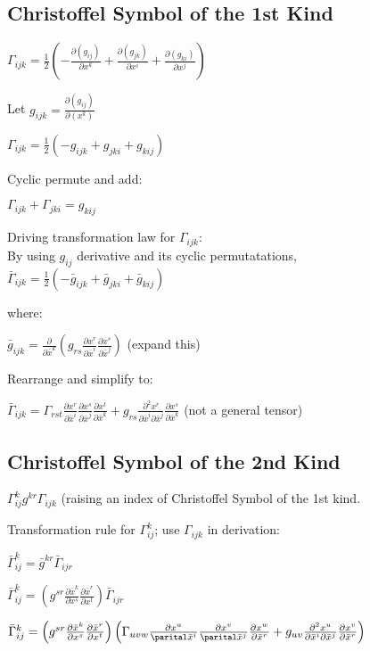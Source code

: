 \documentclass[8pt,letter]{article}
\begin{document}
\begin{multicols*}{2}
  \subsection{Christoffel Symbol of the 1st Kind}

  $\Gamma_{ijk} = \frac{1}{2}\left( - \frac{\partial (g_{ij})}{\partial x^k} + \frac{\partial (g_{jk})}{\partial x^i} + \frac{\partial (g_{ki})}{\partial x^j} \right)$

  Let $g_{ijk}=\frac{\partial(g_{ij})}{\partial(x^k)}$

  $\Gamma_{ijk} = \frac{1}{2}( -g_{ijk} + g_{jki} + g_{kij})$

  Cyclic permute and add:

  $\Gamma_{ijk} + \Gamma_{jki} = g_{kij}$

  Driving transformation law for $\Gamma_{ijk}$:\\
  By using $g_{ij}$ derivative and its cyclic permutatations,\\
  $\bar{\Gamma}_{ijk} = \frac{1}{2}( -\bar{g}_{ijk} + \bar{g}_{jki} + \bar{g}_{kij})$

  where:
  
  $\bar{g}_{ijk} = \frac{\partial}{\partial \bar{x}^k} \left(g_{rs} \frac{\partial x^r}{\partial \bar{x}^i} \frac{\partial x^s}{\partial \bar{x}^j}\right)$ (expand this)

  Rearrange and simplify to:

  $\bar{\Gamma}_{ijk} = \Gamma_{rst} \frac{\partial x^r}{\partial \bar{x}^i} \frac{\partial x^s}{\partial \bar{x}^j} \frac{\partial x^t}{\partial \bar{x}^k} + g_{rs} \frac{\partial^2 x^r}{\partial \bar{x}^i \partial \bar{x}^j} \frac{\partial x^s}{\partial \bar{x}^k}$ (not a general tensor)
  
  \subsection{Christoffel Symbol of the 2nd Kind}

  $\Gamma_{ij}^k g^{kr} \Gamma_{ijk}$ (raising an index of Christoffel Symbol of the 1st kind.

  Transformation rule for $\Gamma_{ij}^k$; use $\Gamma_{ijk}$ in derivation:
  
  $\bar{\Gamma}_{ij}^k = \bar{g}^{kr} \bar{\Gamma}_{ijr}$

  $\bar{\Gamma}_{ij}^k = \left(g^{sr} \frac{\partial \bar{x}^k}{\partial x^s} \frac{\partial \bar{x}^r}{\partial x^t}\right) \bar{\Gamma}_{ijr}$

  $\bar{\Gamma}_{ij}^k = \left(g^{sr} \frac{\partial \bar{x}^k}{\partial x^s} \frac{\partial \bar{x}^r}{\partial x^t}\right) \left(\Gamma_{uvw} \frac{\partial x^u}{\parital \bar{x}^i} \frac{\partial x^v}{\parital \bar{x}^j} \frac{\partial x^w}{\partial \bar{x}^r} + g_{uv} \frac{\partial^2 x^u}{\partial \bar{x}^i \partial \bar{x}^j} \frac{\partial x^v}{\partial \bar{x}^r} \right)$


\end{multicols*}
\end{document}
